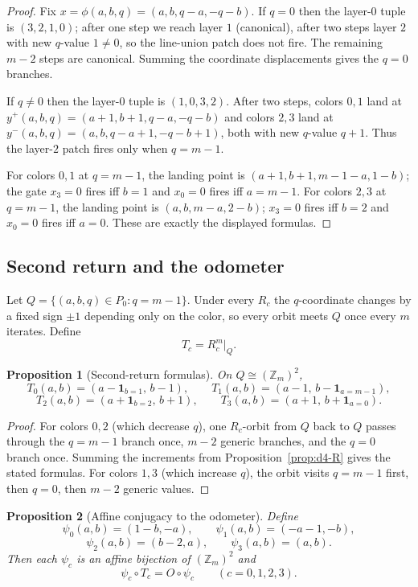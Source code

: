 \documentclass[11pt]{article}
\newtheorem{proposition}{Proposition}
\newcommand{\Zm}{\mathbb Z_m}
\newcommand{\Pzero}{P_0}
\newcommand{\Qslice}{Q}
\newcommand{\I}{\mathbf 1}
\begin{document}
\begin{proof}
Fix $x=\phi(a,b,q)=(a,b,q-a,-q-b)$.
If $q=0$ then the layer-$0$ tuple is $(3,2,1,0)$; after one step we reach layer $1$ (canonical), after two steps layer $2$ with new $q$-value $1\neq 0$, so the line-union patch does not fire.
The remaining $m-2$ steps are canonical.
Summing the coordinate displacements gives the $q=0$ branches.

If $q\neq 0$ then the layer-$0$ tuple is $(1,0,3,2)$.
After two steps, colors $0,1$ land at $y^+(a,b,q)=(a+1,b+1,q-a,-q-b)$ and colors $2,3$ land at $y^-(a,b,q)=(a,b,q-a+1,-q-b+1)$, both with new $q$-value $q+1$.
Thus the layer-$2$ patch fires only when $q=m-1$.

For colors $0,1$ at $q=m-1$, the landing point is $(a+1,b+1,m-1-a,1-b)$; the gate
$x_3=0$ fires iff $b=1$ and $x_0=0$ fires iff $a=m-1$.
For colors $2,3$ at $q=m-1$, the landing point is $(a,b,m-a,2-b)$; $x_3=0$ fires iff $b=2$ and $x_0=0$ fires iff $a=0$.
These are exactly the displayed formulas.
\end{proof}

\subsection{Second return and the odometer}\label{sec:d4-second-return}

Let $\Qslice=\{(a,b,q)\in\Pzero : q=m-1\}$.
Under every $R_c$ the $q$-coordinate changes by a fixed sign $\pm 1$ depending only on the color, so every orbit meets $\Qslice$ once every $m$ iterates.
Define
\[
T_c=R_c^m\big|_{\Qslice}.
\]

\begin{proposition}[Second-return formulas]\label{prop:d4-T}
On $\Qslice\cong (\Zm)^2$,
\[
T_0(a,b)=(a-\I_{b=1},\,b-1),
\qquad
T_1(a,b)=(a-1,\,b-\I_{a=m-1}),
\]
\[
T_2(a,b)=(a+\I_{b=2},\,b+1),
\qquad
T_3(a,b)=(a+1,\,b+\I_{a=0}).
\]
\end{proposition}

\begin{proof}
For colors $0,2$ (which decrease $q$), one $R_c$-orbit from $\Qslice$ back to $\Qslice$ passes through the $q=m-1$ branch once, $m-2$ generic branches, and the $q=0$ branch once.
Summing the increments from Proposition~\ref{prop:d4-R} gives the stated formulas.
For colors $1,3$ (which increase $q$), the orbit visits $q=m-1$ first, then $q=0$, then $m-2$ generic values.
\end{proof}

\begin{proposition}[Affine conjugacy to the odometer]\label{prop:d4-conj}
Define
\[
\psi_0(a,b)=(1-b,-a),
\qquad
\psi_1(a,b)=(-a-1,-b),
\]
\[
\psi_2(a,b)=(b-2,a),
\qquad
\psi_3(a,b)=(a,b).
\]
Then each $\psi_c$ is an affine bijection of $(\Zm)^2$ and
\[
\psi_c\circ T_c = O\circ\psi_c
\qquad (c=0,1,2,3).
\]
\end{proposition}
\end{document}
